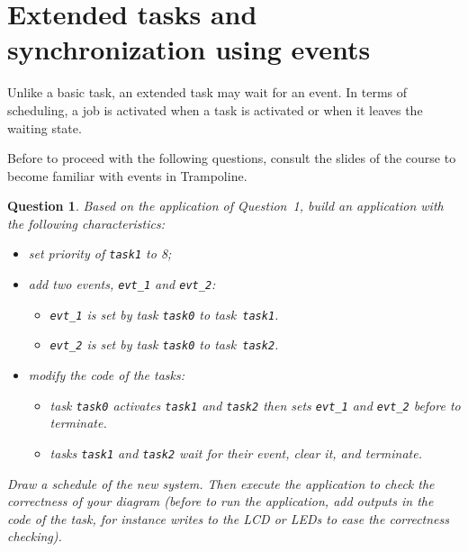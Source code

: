 \documentclass[11pt]{report}
\newtheorem{ex}{Question}
\begin{document}
\section{Extended tasks and synchronization using events}

Unlike a basic task, an extended task may wait for an event.
In terms of scheduling, a job is activated when a task is activated or when it leaves the waiting state.

Before to proceed with the following questions, consult the slides of the course to become familiar with events in Trampoline.


\begin{ex}
     Based on the application of Question~1, build an application with the following characteristics:
\begin{itemize}
    \item set priority of \texttt{task1} to 8;
    \item add two events, \texttt{evt\_1} and \texttt{evt\_2}:
        \begin{itemize}
            \item \texttt{evt\_1} is set by task \texttt{task0} to task \texttt{task1}.
            \item \texttt{evt\_2} is set by task \texttt{task0} to task \texttt{task2}.
        \end{itemize}
    \item modify the code of the tasks:
        \begin{itemize}
            \item task \texttt{task0} activates \texttt{task1} and \texttt{task2} then sets \texttt{evt\_1} and \texttt{evt\_2} before to terminate.
            \item tasks \texttt{task1} and \texttt{task2} wait for their event, clear it, and terminate.
        \end{itemize}
\end{itemize}

Draw a schedule of the new system.
Then execute the application to check the correctness of your diagram (before to run the application, add outputs in the code of the task, for instance writes to the LCD or LEDs to ease the correctness checking).

\end{ex}
\end{document}

